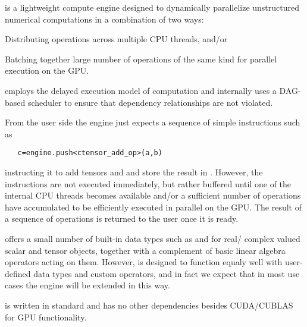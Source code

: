 \Cengine{} is a lightweight \cpp{} compute engine designed to dynamically parallelize unstructured 
numerical computations in a combination of two ways: 
\begin{compactenum}[~~\m{\circ}]
\item Distributing operations across multiple CPU threads, and/or 
\item Batching together large number of operations of the same kind for parallel execution on the GPU. 
\end{compactenum}
\Cengine{} employs the delayed execution model of computation and internally uses a DAG-based scheduler 
to ensure that dependency relationships are not violated. 

From the user side the engine just expects a sequence of simple instructions such as 

\texttt{~~~c=engine.push<ctensor\_add\_op>(a,b)}

instructing it to add tensors  and  and store the result in . 
However, the instructions are not executed immediately, but rather buffered until one of the 
internal CPU threads becomes 
available and/or a sufficient number of operations have accumulated to be efficiently executed in parallel 
on the GPU. The result of a sequence of operations is returned to the user once it is ready. 

\Cengine{} offers a small number of built-in data types such as  and  
for real/ complex valued scalar and tensor objects, together with a complement of basic linear algebra 
operators acting on them. However, is designed to function equaly well with user-defined data types and 
custom operators, and in fact we expect that in most use cases the engine will be extended in this way. 

\Cengine{} is written in standard \cppe{} and has no other dependencies besides CUDA/CUBLAS 
for GPU functionality.  

